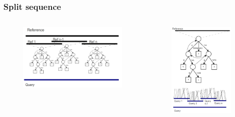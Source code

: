 \documentclass{beamer}
\begin{document}
\begin{frame}
  \frametitle{Split sequence}
  \begin{columns}
    \begin{column}{0.5\textwidth}
  \begin{figure}\includegraphics[scale=0.3]{split_ref.pdf}\end{figure}
  \end{column}
  \begin{column}{0.5\textwidth}
  \begin{figure}
    \includegraphics[scale=0.3]{split_qry.pdf}
  \end{figure}
\end{column}
\end{columns}
\end{frame}
\end{document}
